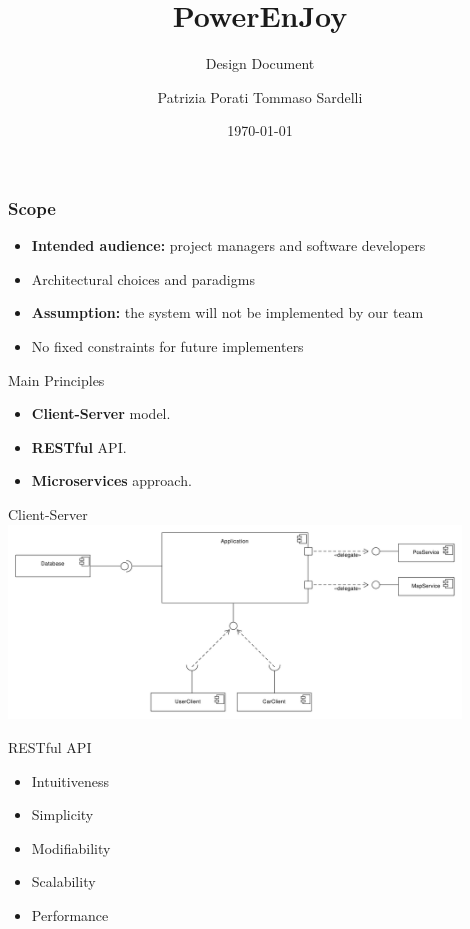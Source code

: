\documentclass{beamer}
\author{Patrizia Porati \newline Tommaso Sardelli}
\title{PowerEnJoy}
\subtitle{Design Document}
\institute{Politecnico di Milano}
\date{\today}
\begin{document}
	
\begin{frame}[t,plain]
    \titlepage
\end{frame}

\begin{frame}
    \frametitle{Scope}
    \begin{itemize}
        \item \textbf{Intended audience:} project managers and software developers 
            \pause
        \item Architectural choices and paradigms
            \pause
        \item \textbf{Assumption:} the system will not be implemented by our team
            \pause
        \item No fixed constraints for future implementers
    \end{itemize}
\end{frame}

\begin{frame} {Main Principles}
    \begin{itemize}
        \item \textbf{Client-Server} model.
        \item \textbf{RESTful} API.
        \item \textbf{Microservices} approach.
    \end{itemize}
\end{frame}

\begin{frame}{Client-Server}
    \includegraphics[width=0.9\textwidth]{high_level_components}
\end{frame}

\begin{frame}{RESTful API}
    \begin{itemize}
        \item Intuitiveness
        \item Simplicity
        \item Modifiability
        \item Scalability
        \item Performance
    \end{itemize}
\end{frame}
\end{document}
